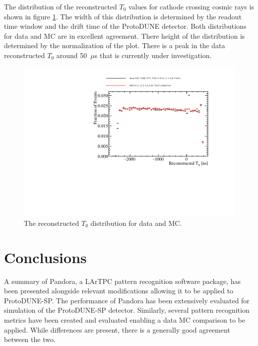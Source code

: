 The distribution of the reconstructed $T_{0}$ values for cathode crossing cosmic rays is shown in figure \ref{fig:recoT0data}.  The width of this distribution is determined by the readout time window and the drift time of the ProtoDUNE detector.  Both distributions for data and MC are in excellent agreement.  There height of the distribution is determined by the normalization of the plot.  There is a peak in the data reconstructed $T_{0}$ around 50~$\mu$s that is currently under investigation.  %

\begin{figure}
\includegraphics[width=1.0\textwidth]{Figures/Metrics/Data/Cosmics/StitchedT0.pdf}
\caption{The reconstructed $T_{0}$ distribution for data and MC.}
\label{fig:recoT0data}
\end{figure}

\section{Conclusions}
A summary of Pandora, a LArTPC pattern recognition software package, has been presented alongside relevant modifications allowing it to be applied to ProtoDUNE-SP.  The performance of Pandora has been extensively evaluated for simulation of the ProtoDUNE-SP detector.  Similarly, several pattern recognition metrics have been created and evaluated enabling a data MC comparison to be applied.  While differences are present, there is a generally good agreement between the two.  

